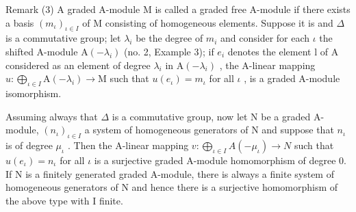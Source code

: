 Remark (3) A graded A-module M is called a graded free A-module if there exists a basis \((m_{\iota})_{\iota \in I}\) of M consisting of homogeneous elements. Suppose it is and \(\Delta\) is a commutative group; let \(\lambda_{i}\) be the degree of \(m_{i}\) and consider for each \(\iota\) the shifted A-module \(\mathrm{A}(-\lambda_{i})\) (no. 2, Example 3); if \(e_{i}\) denotes the element l of A considered as an element of degree \(\lambda_{i}\) in \(\mathrm{A}(-\lambda_{i})\) , the A-linear mapping \(u: \bigoplus_{\iota \in I} \mathrm{A}(-\lambda_{i}) \to \mathrm{M}\) such that \(u(e_{\iota}) = m_{\iota}\) for all \(\iota\) , is a graded A-module isomorphism.

Assuming always that \(\Delta\) is a commutative group, now let N be a graded A-module, \((n_{\iota})_{\iota \in I}\) a system of homogeneous generators of N and suppose that \(n_{\iota}\) is of degree \(\mu_{\iota}\) . Then the A-linear mapping \(v: \bigoplus_{\iota \in I} A(-\mu_{\iota}) \to N\) such that \(u(e_{\iota}) = n_{\iota}\) for all \(\iota\) is a surjective graded A-module homomorphism of degree 0. If N is a finitely generated graded A-module, there is always a finite system of homogeneous generators of N and hence there is a surjective homomorphism of the above type with I finite.

